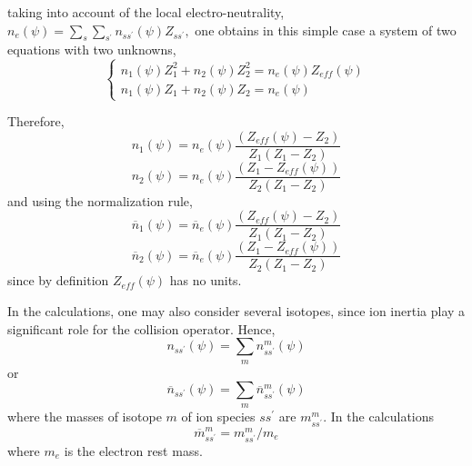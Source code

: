 taking into account of the local electro-neutrality, $n_{e}\left( \psi
\right) =\sum_{s}\sum_{s^{\prime }}n_{ss^{\prime }}\left( \psi \right)
Z_{ss^{\prime }},$ one obtains in this simple case a system of two equations
with two unknowns, 
\begin{equation}
\left\{ 
\begin{array}{l}
n_{1}\left( \psi \right) Z_{1}^{2}+n_{2}\left( \psi \right)
Z_{2}^{2}=n_{e}\left( \psi \right) Z_{eff}\left( \psi \right)  \\ 
n_{1}\left( \psi \right) Z_{1}+n_{2}\left( \psi \right) Z_{2}=n_{e}\left(
\psi \right) 
\end{array}%
\right. 
\end{equation}

Therefore, 
\begin{equation}
n_{1}\left( \psi \right) =n_{e}\left( \psi \right) \frac{\left(
Z_{eff}\left( \psi \right) -Z_{2}\right) }{Z_{1}\left( Z_{1}-Z_{2}\right) }
\end{equation}%
\begin{equation}
n_{2}\left( \psi \right) =n_{e}\left( \psi \right) \frac{\left(
Z_{1}-Z_{eff}\left( \psi \right) \right) }{Z_{2}\left( Z_{1}-Z_{2}\right) }
\end{equation}%
and using the normalization rule, 
\begin{equation}
\overline{n}_{1}\left( \psi \right) =\overline{n}_{e}\left( \psi \right) 
\frac{\left( Z_{eff}\left( \psi \right) -Z_{2}\right) }{Z_{1}\left(
Z_{1}-Z_{2}\right) }
\end{equation}%
\begin{equation}
\overline{n}_{2}\left( \psi \right) =\overline{n}_{e}\left( \psi \right) 
\frac{\left( Z_{1}-Z_{eff}\left( \psi \right) \right) }{Z_{2}\left(
Z_{1}-Z_{2}\right) }
\end{equation}%
since by definition $Z_{eff}\left( \psi \right) $ has no units. 

In the calculations, one may also consider several isotopes, since ion
inertia play a significant role for the collision operator. Hence, 
\begin{equation}
n_{ss^{\prime }}\left( \psi \right) =\sum_{m}n_{ss^{\prime }}^{m}\left( \psi
\right) 
\end{equation}%
or 
\begin{equation}
\overline{n}_{ss^{\prime }}\left( \psi \right) =\sum_{m}\overline{n}%
_{ss^{\prime }}^{m}\left( \psi \right) 
\end{equation}%
where the masses of isotope $m$ of ion species $ss^{\prime }$ are $%
m_{ss^{\prime }}^{m}.$ In the calculations 
\begin{equation}
\overline{m}_{ss^{\prime }}^{m}=m_{ss^{\prime }}^{m}/m_{e}
\end{equation}%
where $m_{e}$ is the electron rest mass.

